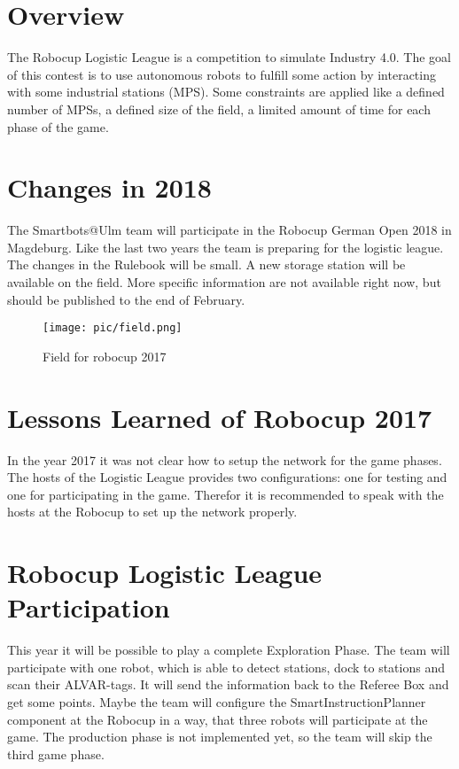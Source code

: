 \section{Overview}

The Robocup Logistic League is a competition to simulate Industry 4.0.  The goal of this contest is to use autonomous robots to fulfill some action by interacting with some industrial stations (MPS). Some constraints are applied like a defined number of MPSs, a defined size of the field, a limited amount of time for each phase of the game. 

\section{Changes in 2018}

The Smartbots@Ulm team will participate in the Robocup German Open 2018 in Magdeburg. Like the last two years the team is preparing for the logistic league. The changes in the Rulebook will be small. A new storage station will be  available on the field. More specific information are not available right now, but should be published to the end of February.

\begin{figure}%
\centering
\texttt{[image: pic/field.png]}
\caption{Field for robocup 2017}
\label{fig:frog}
\end{figure}

\section{Lessons Learned of Robocup 2017}

In the year 2017 it was not clear how to setup the network for the game phases. The hosts of the Logistic League provides two configurations: one for testing and one for participating in the game. Therefor it is recommended to speak with the hosts at the Robocup to set up the network properly. 

\section{Robocup Logistic League Participation}

This year it will be possible to play a complete Exploration Phase. The team will participate with one robot, which is able to detect stations, dock to stations and scan their ALVAR-tags. It will send the information back to the Referee Box and get some points. Maybe the team will configure the SmartInstructionPlanner component at the Robocup in a way, that three robots will participate at the game.
The production phase is not implemented yet, so the team will skip the third game phase.
